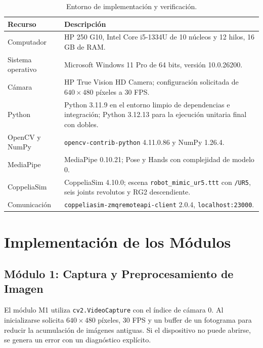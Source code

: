 \begin{table}[H]
    \centering
    \renewcommand{\arraystretch}{1.25}
    \small
    \begin{tabularx}{\textwidth}{p{3.4cm} X}
        \toprule
        \textbf{Recurso} & \textbf{Descripción} \\
        \midrule
        Computador &
        HP 250 G10, Intel Core i5-1334U de 10 núcleos y 12 hilos, 16 GB de RAM. \\
        Sistema operativo &
        Microsoft Windows 11 Pro de 64 bits, versión 10.0.26200. \\
        Cámara &
        HP True Vision HD Camera; configuración solicitada de
        $640\times480$ píxeles a 30 FPS. \\
        Python &
        Python 3.11.9 en el entorno limpio de dependencias e integración;
        Python 3.12.13 para la ejecución unitaria final con dobles. \\
        OpenCV y NumPy &
        \texttt{opencv-contrib-python} 4.11.0.86 y NumPy 1.26.4. \\
        MediaPipe &
        MediaPipe 0.10.21; Pose y Hands con complejidad de modelo 0. \\
        CoppeliaSim &
        CoppeliaSim 4.10.0; escena \texttt{robot\_mimic\_ur5.ttt} con
        \texttt{/UR5}, seis joints revolutos y RG2 descendiente. \\
        Comunicación &
        \texttt{coppeliasim-zmqremoteapi-client} 2.0.4,
        \texttt{localhost:23000}. \\
        \bottomrule
    \end{tabularx}
    \caption{Entorno de implementación y verificación.}
    \label{tab:entorno_implementacion}
\end{table}

\section{Implementación de los Módulos}
\label{sec:implementacion_modulos}

\subsection{Módulo 1: Captura y Preprocesamiento de Imagen}
\label{subsec:implementacion_m1}

El módulo M1 utiliza \texttt{cv2.VideoCapture} con el índice de cámara 0. Al
inicializarse solicita $640\times480$ píxeles, 30 FPS y un buffer de un
fotograma para reducir la acumulación de imágenes antiguas. Si el dispositivo
no puede abrirse, se genera un error con un diagnóstico explícito.

